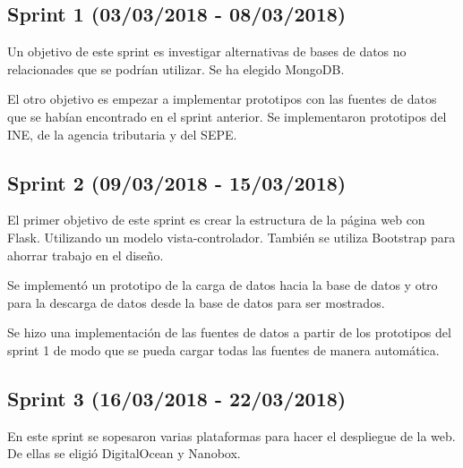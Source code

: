 

\subsection{Sprint 1 (03/03/2018 - 08/03/2018)}

Un objetivo de este sprint es investigar alternativas de bases de datos no relacionades que se podrían utilizar. Se ha elegido MongoDB.

El otro objetivo es empezar a implementar prototipos con las fuentes de datos que se habían encontrado en el sprint anterior. Se implementaron prototipos del INE, de la agencia tributaria y del SEPE.



\subsection{Sprint 2 (09/03/2018 - 15/03/2018)}

El primer objetivo de este sprint es crear la estructura de la página web con Flask. Utilizando un modelo vista-controlador. También se utiliza Bootstrap para ahorrar trabajo en el diseño.

Se implementó un prototipo de la carga de datos hacia la base de datos y otro para la descarga de datos desde la base de datos para ser mostrados.

Se hizo una implementación de las fuentes de datos a partir de los prototipos del sprint 1 de modo que se pueda cargar todas las fuentes de manera automática.



\subsection{Sprint 3 (16/03/2018 - 22/03/2018)}

En este sprint se sopesaron varias plataformas para hacer el despliegue de la web. De ellas se eligió DigitalOcean y Nanobox.

